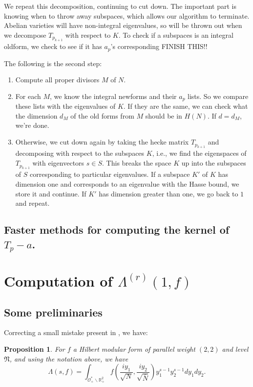 \documentclass{article}
\theoremstyle{plain}
\newtheorem{proposition}{Proposition}
\begin{document}
We repeat this decomposition, continuing to cut down. The important part is knowing when to throw away subspaces, which allows our algorithm to terminate. Abelian varieties will have non-integral eigenvalues, so will be thrown out when we decompose $T_{p_{k+1}}$ with respect to $K$. To check if a subspaces is an integral oldform, we check to see if it has $a_p$'s corresponding FINISH THIS!!

The following is the second step:

\begin{enumerate}
\item Compute all proper divisors $M$ of $N$.
\item For each $M$, we know the integral newforms and their $a_p$ lists.
So we compare these lists with the eigenvalues of $K$.
If they are the same, we can check what the dimension $d_M$ of the old forms from $M$ should be in $H(N)$.
If $d = d_M$, we're done.
\item Otherwise, we cut down again by taking the hecke matrix $T_{p_{k+1}}$ and decomposing with respect to the subspaces $K$,
i.e., we find the eigenspaces of $T_{p_{k+1}}$ with eigenvectors $s \in S$.
This breaks the space $K$ up into the subspaces of $S$ corresponding to particular eigenvalues.
If a subspace $K'$ of $K$ has dimension one and corresponds to an eigenvalue with the Hasse bound,
we store it and continue.
If $K'$ has dimension greater than one,
we go back to $1$ and repeat.
\end{enumerate}

\subsection{Faster methods for computing the kernel of $T_p - a$.}

\section{Computation of $\Lambda^{(r)}(1,f)$}

\subsection{Some preliminaries}

Correcting a small mistake present in \cite{dembele}, we have:

\begin{proposition}
For $f$ a Hilbert modular form of parallel weight $(2,2)$ and level $\mathfrak{N}$, and using the notation above, we have
\begin{equation*}
\Lambda(s,f)= \int_{\mathcal{O}_+^*\backslash \mathbb{R}^2_+} f\left(\frac{iy_1}{\sqrt{N}},\frac{iy_2}{\sqrt{\bar{N}}}\right) y_1^{s-1}y_2^{s-1} dy_1 dy_2.
\end{equation*}
\end{proposition}
\end{document}
